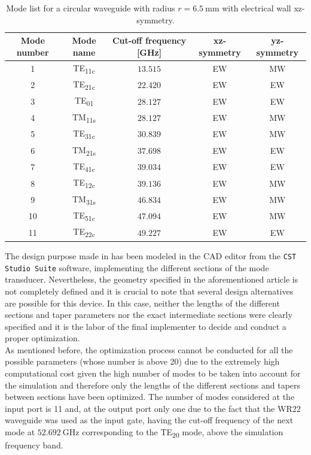 \documentclass[english,twoside]{article}
\begin{document}
    \begin{table}
        \centering		 
        \caption{Mode list for a circular waveguide with radius $r=\SI{6.5}{\milli\meter}$ with electrical wall xz-symmetry.}
        \begin{tabular}{c|c|c|c|c}
          Mode number & Mode name & Cut-off frequency [GHz] & xz-symmetry & yz-symmetry\\
          \hline
          1 & TE\textsubscript{11c} & $\num{13.515}$ & EW & MW\\
          2 & TE\textsubscript{21c} & $\num{22.420}$ & EW & EW\\
          3 & TE\textsubscript{01} & $\num{28.127}$ & EW & EW\\
          4 & TM\textsubscript{11s} & $\num{28.127}$ & EW & MW\\
          5 & TE\textsubscript{31c} & $\num{30.839}$ & EW & MW\\
          6 & TM\textsubscript{21s} & $\num{37.698}$ & EW & EW\\
          7 & TE\textsubscript{41c} & $\num{39.034}$ & EW & EW\\
          8 & TE\textsubscript{12c} & $\num{39.136}$ & EW & MW\\
          9 & TM\textsubscript{31s} & $\num{46.834}$ & EW & MW\\
          10 & TE\textsubscript{51c} & $\num{47.094}$ & EW & MW\\
          11 & TE\textsubscript{22c} & $\num{49.227}$ & EW & EW\\	
        \end{tabular}
        \label{table:wc13_ex}
      \end{table}
    
    The design purpose made in \cite{saad} has been modeled in the CAD editor from the \texttt{CST Studio Suite} software, implementing the different sections of the mode transducer. Nevertheless, the geometry specified in the aforementioned article is not completely defined and it is crucial to note that several design alternatives are possible for this device. In this case, neither the lengths of the different sections and taper parameters nor the exact intermediate sections were clearly specified and it is the labor of the final implementer to decide and conduct a proper optimization.\\
    
    As mentioned before, the optimization process cannot be conducted for all the possible parameters (whose number is above 20) due to the extremely high computational cost given the high number of modes to be taken into account for the simulation and therefore only the lengths of the different sections and tapers between sections have been optimized. The number of modes considered at the input port is 11 and, at the output port only one due to the fact that the \ac{WR}22 waveguide was used as the input gate, having the cut-off frequency of the next mode at $\SI{52.692}{\giga\hertz}$ corresponding to the \ac{TE}\textsubscript{20} mode, above the simulation frequency band.\\
    
\end{document}
